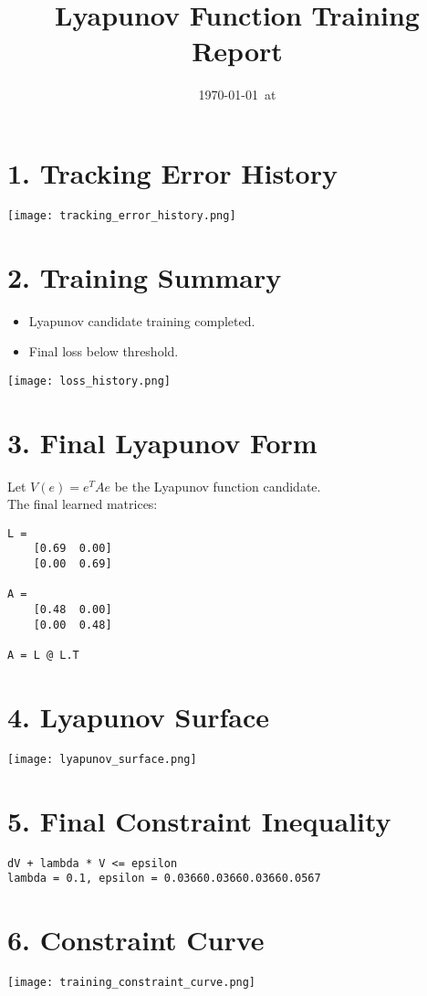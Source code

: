 \documentclass[11pt]{article}
\title{Lyapunov Function Training Report}
\author{}
\date{\today\ at \currenttime}
\begin{document}
\maketitle

\section*{1. Tracking Error History}
\texttt{[image: tracking\_error\_history.png]}

\section*{2. Training Summary}
\begin{itemize}
  \item Lyapunov candidate training completed.
  \item Final loss below threshold.
\end{itemize}
\texttt{[image: loss\_history.png]}

\section*{3. Final Lyapunov Form}
Let $V(e) = e^T A e$ be the Lyapunov function candidate. \\
The final learned matrices:
\begin{verbatim}
L = 
    [0.69  0.00]
    [0.00  0.69]

A = 
    [0.48  0.00]
    [0.00  0.48]

A = L @ L.T
\end{verbatim}

\section*{4. Lyapunov Surface}
\texttt{[image: lyapunov\_surface.png]}

\section*{5. Final Constraint Inequality}
\begin{verbatim}
dV + lambda * V <= epsilon
lambda = 0.1, epsilon = 0.03660.03660.03660.0567
\end{verbatim}

\section*{6. Constraint Curve}
\texttt{[image: training\_constraint\_curve.png]}
\end{document}
